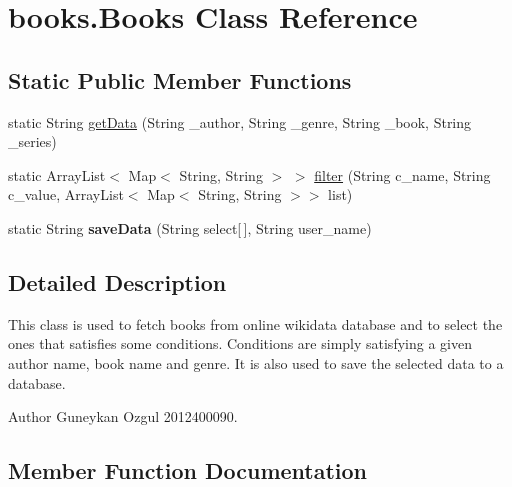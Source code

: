 \hypertarget{classbooks_1_1_books}{}\section{books.\+Books Class Reference}
\label{classbooks_1_1_books}
\subsection*{Static Public Member Functions}
\begin{DoxyCompactItemize}
\item 
static String \hyperlink{classbooks_1_1_books_ad3d13a869f62cd65a802506f49a80dd6}{get\+Data} (String \+\_\+author, String \+\_\+genre, String \+\_\+book, String \+\_\+series)
\item 
static Array\+List$<$ Map$<$ String, String $>$ $>$ \hyperlink{classbooks_1_1_books_a7b554afada1d575adfa93051017c48a1}{filter} (String c\+\_\+name, String c\+\_\+value, Array\+List$<$ Map$<$ String, String $>$$>$ list)
\item 
static String {\bfseries save\+Data} (String select\mbox{[}$\,$\mbox{]}, String user\+\_\+name)\hypertarget{classbooks_1_1_books_a89b6f2589616459ea8962b1bef746dea}{}\label{classbooks_1_1_books_a89b6f2589616459ea8962b1bef746dea}

\end{DoxyCompactItemize}


\subsection{Detailed Description}
This class is used to fetch books from online wikidata database and to select the ones that satisfies some conditions. Conditions are simply satisfying a given author name, book name and genre. It is also used to save the selected data to a database.

\begin{DoxyAuthor}{Author}
Guneykan Ozgul 2012400090. 
\end{DoxyAuthor}


\subsection{Member Function Documentation}
